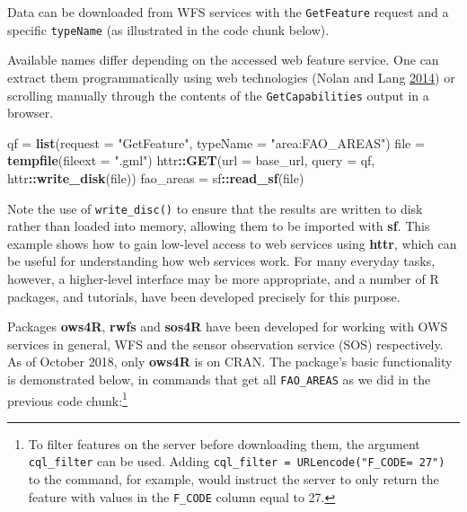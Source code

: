 \documentclass[]{krantz}
\newenvironment{Shaded}{\begin{snugshade}}{\end{snugshade}}
\newcommand{\DataTypeTok}[1]{\textcolor[rgb]{0.27,0.27,0.27}{#1}}
\newcommand{\KeywordTok}[1]{\textcolor[rgb]{0.27,0.27,0.27}{\textbf{#1}}}
\newcommand{\NormalTok}[1]{#1}
\newcommand{\OperatorTok}[1]{\textcolor[rgb]{0.43,0.43,0.43}{\textbf{#1}}}
\newcommand{\StringTok}[1]{\textcolor[rgb]{0.5,0.5,0.5}{#1}}
\let\rmarkdownfootnote\footnote%
\def\footnote{\protect\rmarkdownfootnote}
\begin{document}
Data can be downloaded from WFS services with the \texttt{GetFeature} request and a specific \texttt{typeName} (as illustrated in the code chunk below).

Available names differ depending on the accessed web feature service.
One can extract them programmatically using web technologies (Nolan and Lang \protect\hyperlink{ref-nolan_xml_2014}{2014}) or scrolling manually through the contents of the \texttt{GetCapabilities} output in a browser.

\begin{Shaded}
\begin{Highlighting}[]
\NormalTok{qf =}\StringTok{ }\KeywordTok{list}\NormalTok{(}\DataTypeTok{request =} \StringTok{"GetFeature"}\NormalTok{, }\DataTypeTok{typeName =} \StringTok{"area:FAO_AREAS"}\NormalTok{)}
\NormalTok{file =}\StringTok{ }\KeywordTok{tempfile}\NormalTok{(}\DataTypeTok{fileext =} \StringTok{".gml"}\NormalTok{)}
\NormalTok{httr}\OperatorTok{::}\KeywordTok{GET}\NormalTok{(}\DataTypeTok{url =}\NormalTok{ base_url, }\DataTypeTok{query =}\NormalTok{ qf, httr}\OperatorTok{::}\KeywordTok{write_disk}\NormalTok{(file))}
\NormalTok{fao_areas =}\StringTok{ }\NormalTok{sf}\OperatorTok{::}\KeywordTok{read_sf}\NormalTok{(file)}
\end{Highlighting}
\end{Shaded}

Note the use of \texttt{write\_disc()} to ensure that the results are written to disk rather than loaded into memory, allowing them to be imported with \textbf{sf}.
This example shows how to gain low-level access to web services using \textbf{httr}, which can be useful for understanding how web services work.
For many everyday tasks, however, a higher-level interface may be more appropriate, and a number of R packages, and tutorials, have been developed precisely for this purpose.

Packages \textbf{ows4R}, \textbf{rwfs} and \textbf{sos4R} have been developed for working with OWS services in general, WFS and the sensor observation service (SOS) respectively.
As of October 2018, only \textbf{ows4R} is on CRAN.
The package's basic functionality is demonstrated below, in commands that get all \texttt{FAO\_AREAS} as we did in the previous code chunk:\footnote{To filter features on the server before downloading them, the argument \texttt{cql\_filter} can be used. Adding \texttt{cql\_filter\ =\ URLencode("F\_CODE=\ \textquotesingle{}27\textquotesingle{}")} to the command, for example, would instruct the server to only return the feature with values in the \texttt{F\_CODE} column equal to 27.}
\end{document}
